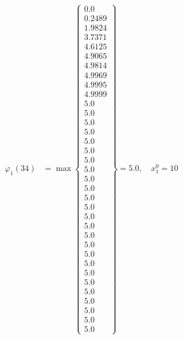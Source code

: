 \documentclass{article}
\begin{document}
\begin{align*}
\varphi_{1}(34) &= \max \left\{ \begin{array}{c}
0.0 \\
 0.2489 \\
 1.9824 \\
 3.7371 \\
 4.6125 \\
 4.9065 \\
 4.9814 \\
 4.9969 \\
 4.9995 \\
 4.9999 \\
 5.0 \\
 5.0 \\
 5.0 \\
 5.0 \\
 5.0 \\
 5.0 \\
 5.0 \\
 5.0 \\
 5.0 \\
 5.0 \\
 5.0 \\
 5.0 \\
 5.0 \\
 5.0 \\
 5.0 \\
 5.0 \\
 5.0 \\
 5.0 \\
 5.0 \\
 5.0 \\
 5.0 \\
 5.0 \\
 5.0 \\
 5.0 \\
 5.0
\end{array} \right\}=5.0, \quad x_{1}^0=10\\
  

\end{align*}
\end{document}
